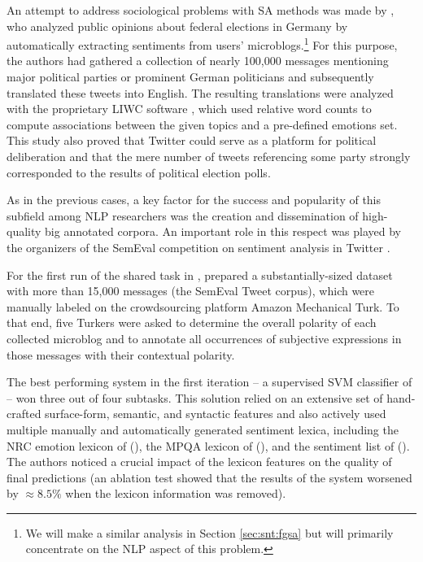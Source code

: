 An attempt to address sociological problems with SA methods was made
by \citet{Tumasjan:10}, who analyzed public opinions about federal
elections in Germany by automatically extracting sentiments from
users' microblogs.\footnote{We will make a similar analysis in Section
  \ref{sec:snt:fgsa} but will primarily concentrate on the NLP aspect
  of this problem.}  For this purpose, the authors had gathered a
collection of nearly 100,000 messages mentioning major political
parties or prominent German politicians and subsequently translated
these tweets into English.  The resulting translations were analyzed
with the proprietary LIWC software \cite{Pannebaker:07}, which used
relative word counts to compute associations between the given topics
and a pre-defined emotions set.  This study also proved that Twitter
could serve as a platform for political deliberation and that the mere
number of tweets referencing some party strongly corresponded to the
results of political election polls.

As in the previous cases, a key factor for the success and popularity
of this subfield among NLP researchers was the creation and
dissemination of high-quality big annotated corpora.  An important
role in this respect was played by the organizers of the SemEval
competition on sentiment analysis in Twitter
\cite{Nakov:13,Rosenthal:14,Rosenthal:15}.

For the first run of the shared task in \citeyear{Nakov:13},
\citet{Nakov:13} prepared a substantially-sized dataset with more than
15,000 messages (the SemEval Tweet corpus), which were manually
labeled on the crowdsourcing platform Amazon Mechanical Turk.  To that
end, five Turkers were asked to determine the overall polarity of each
collected microblog and to annotate all occurrences of subjective
expressions in those messages with their contextual polarity.

The best performing system in the first iteration -- a supervised SVM
classifier of \citet{Mohammad:13} -- won three out of four subtasks.
This solution relied on an extensive set of hand-crafted surface-form,
semantic, and syntactic features and also actively used multiple
manually and automatically generated sentiment lexica, including the
NRC emotion lexicon of \citeauthor{Mohammad:13a}
(\citeyear{Mohammad:13a}), the MPQA lexicon of \citeauthor{Wilson:05}
(\citeyear{Wilson:05}), and the sentiment list of \citeauthor{Hu:04}
(\citeyear{Hu:04}).  The authors noticed a crucial impact of the
lexicon features on the quality of final predictions (an ablation test
showed that the results of the system worsened by $\approx8.5\%$ when
the lexicon information was removed).

